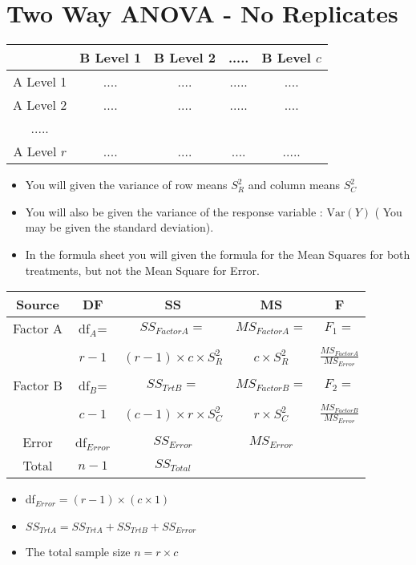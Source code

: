 \documentclass[]{article}
\begin{document}
\Large
\section*{Two Way ANOVA -  No Replicates}
\begin{center}
\begin{tabular}{|c|c|c|c|c|}
	\hline  & B Level 1 & B Level 2 & ..... & B Level $c$ \\ 
	\hline A Level 1 & .... & .... & ..... & .... \\ 
	\hline A Level 2 & .... & .... & ..... & .... \\ 
	\hline ..... & \phantom{spacesp} & \phantom{spacesp} & \phantom{spacesp} & \phantom{spacesp}\\ 
	\hline A Level $r$ & .... & .... & .... & ..... \\ 
	\hline 
\end{tabular} 
\end{center}

\begin{itemize}
	\item You will given the variance of row means $S^2_R$ and column means $S^2_C$
	\item You will also be given the variance of the response variable : $\mbox{Var}(Y)$ ( You may be given the standard deviation).
 \item In the formula sheet you will given the formula for the Mean Squares for both treatments, but not the Mean Square for Error.
\end{itemize}

\begin{center}
\begin{tabular}{|c|c|c|c|c|}
	\hline Source & DF & SS & MS & F \\ 
	\hline Factor A & df$_{A}$= & $SS_{Factor A} = $ & $MS_{Factor A} = $ &  $F_1 = $\\ &&&& 
	\\
  &  $r-1$ & $(r-1) \times c \times S^2_R$ & $c \times S^2_R$  & $ \displaystyle{\frac{MS_{Factor A} }{MS_{Error}} }$ \\ \phantom{spaces}&\phantom{spaces} &\phantom{spaces}&\phantom{spaces}& \phantom{spacesp}
  \\
	\hline \phantom{sp} Factor B \phantom{sp} & df$_{B}$=  & $SS_{TrtB} = $ & $MS_{Factor B}=$& $F_2 = $ \\ &&&& 
	\\
		 & $c-1$  & $(c-1) \times r \times S^2_C$ &   $ r \times S^2_C$ & $ \displaystyle{\frac{MS_{Factor B} }{MS_{Error}} }$ \\ &&&& 
		 \\
	\hline Error & df$_{Error}$ & $SS_{Error}$ & $MS_{Error}$  &  \\ 
	\hline Total & \phantom{sp}$n-1$ \phantom{sp}& $SS_{Total} $ &  &  \phantom{spacespac}\\ 
\hline 
\end{tabular} 
\end{center}
\phantom{sp}


\begin{itemize}
	\item df$_{Error} = (r-1)\times (c \times 1)$
	\item $SS_{TrtA} = SS_{TrtA} + SS_{TrtB} + SS_{Error}$
	\item The total sample size $n=r \times c$
\end{itemize}
\end{document}
